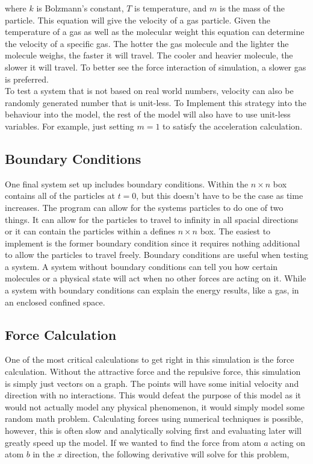 \documentclass[reprint,amsmath,amssymb, aps, 10pt, a4paper, english, reqno]{revtex4-1}
\begin{document}
\begin{multicols}{2}
where $k$ is Bolzmann's constant, $T$ is temperature, and $m$ is the mass of the particle. This equation will give the velocity of a gas particle. Given the temperature of a gas as well as the molecular weight this equation can determine the velocity of a specific gas. The hotter the gas molecule and the lighter the molecule weighs, the faster it will travel. The cooler and heavier molecule, the slower it will travel. To better see the force interaction of simulation, a slower gas is preferred. \\

To test a system that is not based on real world numbers, velocity can also be randomly generated number that is unit-less. To Implement this strategy into the behaviour into the model, the rest of the model will also have to use unit-less variables. For example, just setting $m = 1$ to satisfy the acceleration calculation.  

\subsection{Boundary Conditions}

One final system set up includes boundary conditions. Within the $n \times n$ box contains all of the particles at $t = 0$, but this doesn't have to be the case as time increases. The program can allow for the systems particles to do one of two things. It can allow for the particles to travel to infinity in all spacial directions or it can contain the particles within a defines $n \times n$ box. The easiest to implement is the former boundary condition since it requires nothing additional to allow the particles to travel freely. Boundary conditions are useful when testing a system. A system without boundary conditions can tell you how certain molecules or a physical state will act when no other forces are acting on it. While a system with boundary conditions can explain the energy results, like a gas, in an enclosed confined space.

\subsection{Force Calculation}

One of the most critical calculations to get right in this simulation is the force calculation. Without the attractive force and the repulsive force, this simulation is simply just vectors on a graph. The points will have some initial velocity and direction with no interactions. This would defeat the purpose of this model as it would not actually model any physical phenomenon, it would simply model some random math problem. Calculating forces using numerical techniques is possible, however, this is often slow and analytically solving first and evaluating later will greatly speed up the model. If we wanted to find the force from atom $a$ acting on atom $b$ in the $x$ direction, the following derivative will solve for this problem,


\end{multicols}
\end{document}
